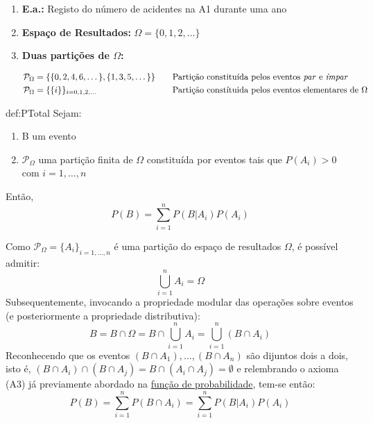 \vspace{-0.75em}
\begin{enumerate}[label=$\bullet$]
    \item \textbf{E.a.:} Registo do número de acidentes na A1 durante uma ano
    \item \textbf{Espaço de Resultados:} $\Omega = \{0,1,2,\dots\}$
    \item \textbf{Duas partições de $\Omega$:}
    
    \vspace{-2.25 em}
    \begin{align*}
       & \mathcal{P}_\Omega = \{\{0,2,4,6,\dots\}, \{1,3,5,\dots\}\}\quad &&\text{Partição constituída pelos eventos \textit{par} e \textit{ímpar}}\\
       & \mathcal{P}_\Omega = \{\{i\}\}_{i = 0,1,2,\dots}\quad &&\text{Partição constítuida pelos eventos elementares de $\Omega$ }
    \end{align*}
\end{enumerate}

\begin{theo}{def:PTotal}\label{def:PTotal}
    Sejam:

    \vspace{-1em}
    \begin{enumerate}[label=$\bullet$]
        \item B um evento
        \item $\mathcal{P}_\Omega$ uma partição finita de $\Omega$ constituída por eventos tais que $P(A_i) > 0$ com $i = 1,\dots, n$
    \end{enumerate}

    \vspace{-1em}
    \noindent Então,
    $$
        P(B) = \sum_{i=1}^{n}P(B | A_i)P(A_i)
    $$
\end{theo}
Como $\mathcal{P}_\Omega = \{A_i\}_{i=1,\dots,n}$ é uma partição do espaço de resultados $\Omega$, é possível admitir:
$$
    \bigcup_{i=1}^{n} A_i = \Omega
$$
Subsequentemente, invocando a propriedade modular das operações sobre eventos (e posteriormente a propriedade distributiva):
$$
    B = B \cap \Omega
    = B \cap \bigcup_{i=1}^{n} A_i
    = \bigcup_{i=1}^{n} (B \cap A_i)
$$
Reconhecendo que os eventos $(B \cap A_1), \dots, (B \cap A_n)$ são dijuntos dois a dois, isto é, $(B \cap A_i) \cap (B \cap A_j) = B \cap (A_i \cap A_j) = \emptyset$ e relembrando o axioma (A3) já previamente abordado na \hyperref[def:probability-function]{função de probabilidade}, tem-se então:
$$
    P(B) = \sum_{i=1}^{n} P(B \cap A_i) = \boxed{\sum_{i=1}^{n} P(B|A_i)P(A_i)}
$$

